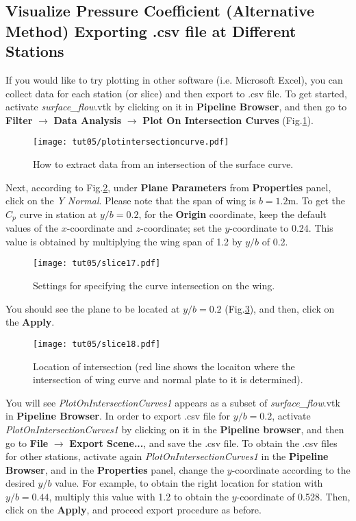 \subsection{Visualize Pressure Coefficient (Alternative Method) Exporting .csv file at Different Stations}
If you would like to try plotting in other software (i.e. Microsoft Excel), you can collect data for each station (or slice) and then export to .csv file. To get started, activate \textit{surface\_flow}.vtk by clicking on it in \textbf{Pipeline Browser}, and then go to \textbf{Filter} $\rightarrow$ \textbf{Data Analysis} $\rightarrow$ \textbf{Plot On Intersection Curves} (Fig.\ref{fig5:plotinintersectioncurve5}).
\begin{figure}[htbp]
    \centering
    \texttt{[image: tut05/plotintersectioncurve.pdf]}
    \caption{How to extract data from an intersection of the surface curve. }
    \label{fig5:plotinintersectioncurve5}
\end{figure}
Next, according to Fig.\ref{fig5:slice17}, under \textbf{Plane Parameters} from \textbf{Properties} panel, click on the \textit{Y Normal}. Please note that the span of wing is $b=1.2$m. To get the $C_p$ curve in station at $y/b=0.2$, for the \textbf{Origin} coordinate, keep the default values of the $x$-coordinate and $z$-coordinate; set the $y$-coordinate to 0.24. This value is obtained by multiplying the wing span of 1.2 by $y/b$ of 0.2.
\begin{figure}[htbp]
    \centering
    \texttt{[image: tut05/slice17.pdf]}
    \caption{Settings for specifying the curve intersection on the wing.}
    \label{fig5:slice17}
\end{figure}
You should see the plane to be located at $y/b = 0.2$ (Fig.\ref{fig5:slice18}), and then, click on the \textbf{Apply}.
\begin{figure}[htbp]
    \centering
    \texttt{[image: tut05/slice18.pdf]}
    \caption{Location of intersection (red line shows the locaiton where the intersection of wing curve and normal plate to it is determined).}
    \label{fig5:slice18}
\end{figure}
You will see \textit{PlotOnIntersectionCurves1} appears as a subset of \textit{surface\_flow}.vtk in \textbf{Pipeline Browser}. In order to export .csv file for $y/b=0.2$, activate \textit{PlotOnIntersectionCurves1} by clicking on it in the \textbf{Pipeline browser}, and then go to \textbf{File} $\rightarrow$ \textbf{Export Scene...}, and save the .csv file. To obtain the .csv files for other stations, activate again \textit{PlotOnIntersectionCurves1} in the \textbf{Pipeline Browser}, and in the \textbf{Properties} panel, change the $y$-coordinate according to the desired $y/b$ value. For example, to obtain the right location for station with $y/b=0.44$, multiply this value with 1.2 to obtain the $y$-coordinate of 0.528. Then, click on the \textbf{Apply}, and proceed export procedure as before.

